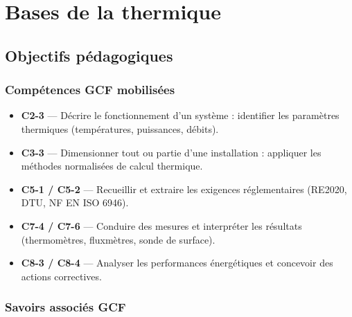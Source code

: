 
\chapter{Bases de la thermique}

\section{Objectifs pédagogiques}

\subsection*{Compétences GCF mobilisées}

\begin{itemize}
  \item \textbf{C2-3} — Décrire le fonctionnement d'un système : identifier les paramètres
        thermiques (températures, puissances, débits).
  \item \textbf{C3-3} — Dimensionner tout ou partie d'une installation : appliquer les
        méthodes normalisées de calcul thermique.
  \item \textbf{C5-1 / C5-2} — Recueillir et extraire les exigences réglementaires (RE2020,
        DTU, NF EN ISO 6946).
  \item \textbf{C7-4 / C7-6} — Conduire des mesures et interpréter les résultats
        (thermomètres, fluxmètres, sonde de surface).
  \item \textbf{C8-3 / C8-4} — Analyser les performances énergétiques et concevoir des
        actions correctives.
\end{itemize}

\subsection*{Savoirs associés GCF}

